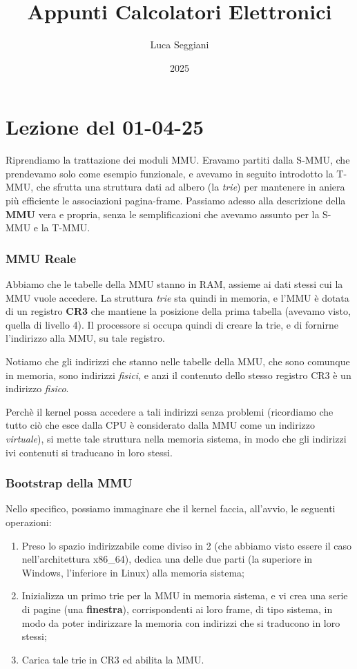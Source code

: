 \documentclass[a4paper,11pt]{article}
\title{Appunti Calcolatori Elettronici}
\author{Luca Seggiani}
\date{2025}
\begin{document}
\section{Lezione del 01-04-25}

\thispagestyle{empty}
\pagestyle{fancy}

Riprendiamo la trattazione dei moduli MMU.
Eravamo partiti dalla S-MMU, che prendevamo solo come esempio funzionale, e avevamo in seguito introdotto la T-MMU, che sfrutta una struttura dati ad albero (la \textit{trie}) per mantenere in aniera più efficiente le associazioni pagina-frame.
Passiamo adesso alla descrizione della \textbf{MMU} vera e propria, senza le semplificazioni che avevamo assunto per la S-MMU e la T-MMU.

\subsubsection{MMU Reale}
Abbiamo che le tabelle della MMU stanno in RAM, assieme ai dati stessi cui la MMU vuole accedere.
La struttura \textit{trie} sta quindi in memoria, e l'MMU è dotata di un registro \textbf{CR3} che mantiene la posizione della prima tabella (avevamo visto, quella di livello 4). 
Il processore si occupa quindi di creare la trie, e di fornirne l'indirizzo alla MMU, su tale registro.

Notiamo che gli indirizzi che stanno nelle tabelle della MMU, che sono comunque in memoria, sono indirizzi \textit{fisici}, e anzi il contenuto dello stesso registro CR3 è un indirizzo \textit{fisico}.

Perchè il kernel possa accedere a tali indirizzi senza problemi (ricordiamo che tutto ciò che esce dalla CPU è considerato dalla MMU come un indirizzo \textit{virtuale}), si mette tale struttura nella memoria sistema, in modo che gli indirizzi ivi contenuti si traducano in loro stessi.

\subsubsection{Bootstrap della MMU}
Nello specifico, possiamo immaginare che il kernel faccia, all'avvio, le seguenti operazioni:
\begin{enumerate}
	\item Preso lo spazio indirizzabile come diviso in 2 (che abbiamo visto essere il caso nell'architettura x86\_64), dedica una delle due parti (la superiore in Windows, l'inferiore in Linux) alla memoria sistema;
	\item Inizializza un primo trie per la MMU in memoria sistema, e vi crea una serie di pagine (una \textbf{finestra}), corrispondenti ai loro frame, di tipo sistema, in modo da poter indirizzare la memoria con indirizzi che si traducono in loro stessi;
	\item Carica tale trie in CR3 ed abilita la MMU.
\end{enumerate}
\end{document}
